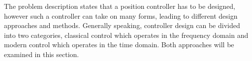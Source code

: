 \documentclass[../../main.tex]{subfiles}
\begin{document}
The problem description states that a position controller has to be designed, however such a controller can take on many forms, leading to different design approaches and methods. Generally speaking, controller design can be divided into two categories, classical control which operates in the frequency domain and modern control which operates in the time domain. Both approaches will be examined in this section.












\end{document}

